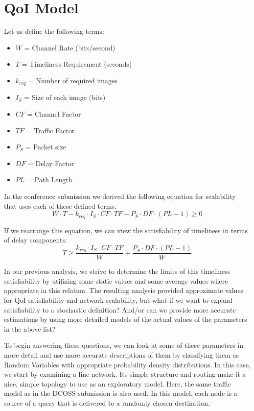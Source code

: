 \section{QoI Model}
\label{sec:qoi_model}

Let us define the following terms:

\begin{itemize}
  \item $W$ = Channel Rate (bits/second)
  \item $T$ = Timeliness Requirement (seconds)
  \item $k_{req}$ = Number of required images
  \item $I_S$ = Size of each image (bits)
  \item $CF$ = Channel Factor
  \item $TF$ = Traffic Factor
  \item $P_S$ = Packet size
  \item $DF$ = Delay Factor
  \item $PL$ = Path Length
\end{itemize}

In the conference submission we derived the following equation for scalability that uses each of these defined terms:
\begin{equation}
	W \cdot T - k_{req} \cdot I_S \cdot CF \cdot TF - P_S \cdot DF \cdot (PL-1) \geq 0	
\end{equation}

If we rearrange this equation, we can view the satisfiability of timeliness in terms of delay components:
\begin{equation}
	T \geq \frac{ k_{req} \cdot I_S \cdot CF \cdot TF}{W} + \frac{P_S \cdot DF \cdot (PL-1)}{W}
\end{equation}

In our previous analysis, we strive to determine the limits of this timeliness satisfiability by utilizing some static values and some average values where appropriate in this relation.  The resulting analysis provided approximate values for QoI satisfiability and network scalability, but what if we want to expand satisfiability to a stochastic definition?  And/or can we provide more accurate estimations by using more detailed models of the actual values of the parameters in the above list? 

To begin answering these questions, we can look at some of these parameters in more detail and use more accurate descriptions of them by classifying them as Random Variables with appropriate probability density distributions.  In this case, we start by examining a line network.  Its simple structure and routing make it a nice, simple topology to use as an exploratory model.  Here, the same traffic model as in the DCOSS submission is also used.  In this model, each node is a source of a query that is delivered to a randomly chosen destination.  

